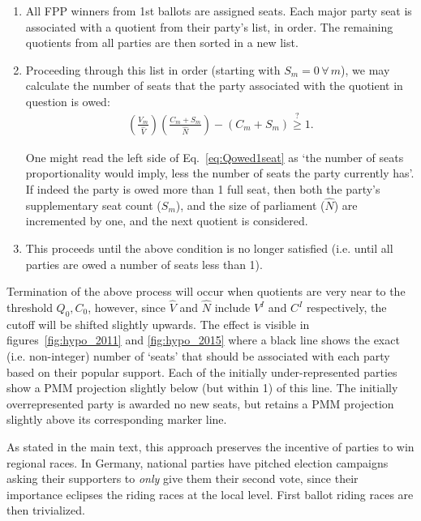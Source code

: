 \documentclass[DIV=calc, paper=a4, fontsize=11pt, twocolumn]{scrartcl}	 %
\begin{document}
\begin{enumerate}
\item All FPP winners from 1st ballots are assigned seats. 
Each major party seat is associated with a quotient from their party's list, in order. The remaining quotients from all parties are then sorted in a new list.

\item Proceeding through this list in order (starting with $S_m=0 \, \forall \, m$), we may calculate the number of seats that the party associated with the quotient in question is owed:
\begin{align}
\left(\frac{V_m}{\hat{V}}\right)\left(\frac{C_m+S_m}{\hat{N}}\right)-(C_m+S_m)\stackrel{?}{\ge} 1.
\label{eq:Qowed1seat}
\end{align} 

One might read the left side of Eq.~\ref{eq:Qowed1seat} as `the number of seats proportionality would imply, less the number of seats the party currently has'.
If indeed the party is owed more than 1 full seat, then both the party's supplementary seat count ($S_m$), and the size of parliament ($\hat{N}$) are incremented by one, and the next quotient is considered. 

\item This proceeds until the above condition is no longer satisfied (i.e. until all parties are owed a number of seats less than 1). 
\end{enumerate}

Termination of the above process will occur when quotients are very near to the threshold $Q_0,C_0$, however, since $\hat{V}$ and $\hat{N}$ include $V^I$ and $C^I$ respectively, the cutoff will be shifted slightly upwards. The effect is visible in figures~\ref{fig:hypo_2011} and \ref{fig:hypo_2015} where a black line shows the exact (i.e. non-integer) number of `seats' that should be associated with each party based on their popular support. Each of the initially under-represented parties show a PMM projection slightly below (but within 1) of this line. The initially overrepresented party is awarded no new seats, but retains a PMM projection slightly above its corresponding marker line.

As stated in the main text, this approach preserves the incentive of parties to win regional races. In Germany, national parties have pitched election campaigns asking their supporters to \emph{only} give them their second vote, since their importance eclipses the riding races at the local level. First ballot riding races are then trivialized. 
\end{document}
